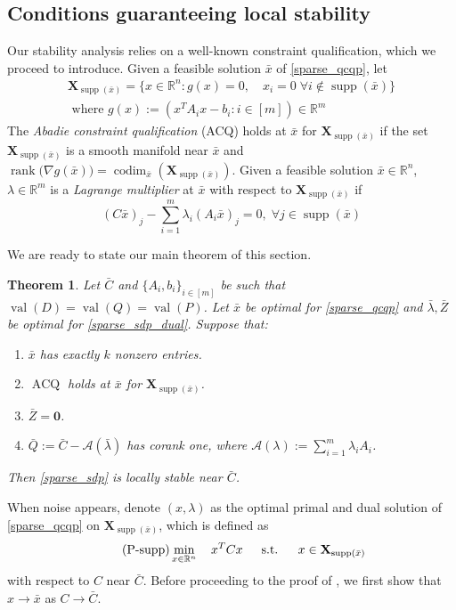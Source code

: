 \documentclass[11pt]{amsart}
\theoremstyle{plain}
\newtheorem{thm}{Theorem}[section]
\theoremstyle{definition}
\theoremstyle{remark}
\newcommand{\vX}{{\mathbf{X}}}
\newcommand{\cA}{{\mathcal{A}}}
\newcommand{\RR}{\mathbb{R}}
\newcommand{\vzero}{\mathbf{0}}
\newcommand{\st}{\text{\, s.t.\, }}
\DeclareMathOperator{\rank}{rank}
\DeclareMathOperator{\codim}{codim}
\DeclareMathOperator{\val}{val}
\DeclareMathOperator{\ACQ}{ACQ}
\DeclareMathOperator{\supp}{supp}
\begin{document}
	\subsection{Conditions guaranteeing local stability}
	
	Our stability analysis relies on a well-known constraint qualification, which we proceed to introduce.
	Given a feasible solution $\bar x$ of \eqref{sparse_qcqp}, let
	\begin{gather*}
		\vX_{\supp (\bar x)} = \{x\in\RR^n: g(x) = 0, \quad x_i = 0\;  \forall i \notin \supp(\bar x)\}
		\\
		\text{ where }
		g(x) := (x^T A_i x - b_i : i \in [m]) \in \RR^m
	\end{gather*}
	The \textit{Abadie constraint qualification} (ACQ) holds at $\bar x$ for $\vX_{\supp (\bar x)}$ if the set $\vX_{\supp (\bar x)}$ is a smooth manifold near $\bar x$ and $\rank\big(\nabla g (\bar x)\big) = \codim_{\bar x}(\vX_{\supp (\bar x)})$. Given a feasible solution \(\bar x\in\RR^n\), \(\lambda\in \RR^m\) is a \textit{Lagrange multiplier} at \(\bar x\) with respect to \(\vX_{\supp (\bar x)}\) if
	\[
	(C \bar x)_j - \sum_{i=1}^m\lambda_i (A_i\bar x)_j = 0,\; \forall j\in \supp(\bar x)
	\]
	
	We are ready to state our main theorem of this section.
	
	\begin{thm}\label{thm:sparse_local_stability}
		Let \(\bar C\) and \(\{A_i, b_i\}_{i\in [m]}\) be such that \(\val(D) = \val(Q) = \val(P)\).
		Let $\bar x$ be optimal for \eqref{sparse_qcqp}
		and $\bar\lambda,\bar Z$ be optimal for \eqref{sparse_sdp_dual}.
		Suppose that:
		\begin{enumerate}[label=(\alph*)]
			\item $\bar x$ has exactly $k$ nonzero entries.
			\item $\ACQ$ holds at $\bar x$ for $\vX_{\supp (\bar x)}$.
			\item $\bar Z = \vzero$. 
			\item $\bar Q:= \bar C - \cA(\bar\lambda)$ has corank one, where \(\cA(\lambda):= \sum_{i=1}^m \lambda_i A_i\).
		\end{enumerate}
		Then \eqref{sparse_sdp} is locally stable near $\bar C$.
	\end{thm}

    When noise appears, denote $( x, \lambda)$ as the optimal primal and dual solution of \eqref{sparse_qcqp} on \(\vX_{\supp (\bar x)}\), which is defined as 
	\begin{equation}\label{sparse_qcqp_supp}
        \tag{P-supp}
		\min_{x\in\RR^n}\quad x^T C x
		\quad\st\quad x \in \vX_{\supp (\bar x)}
	\end{equation}
	with respect to  \(C\) near \(\bar C\).
    Before proceeding to the proof of , we first show that \(x \rightarrow \bar x\) as \(C\rightarrow \bar C\).
\end{document}

